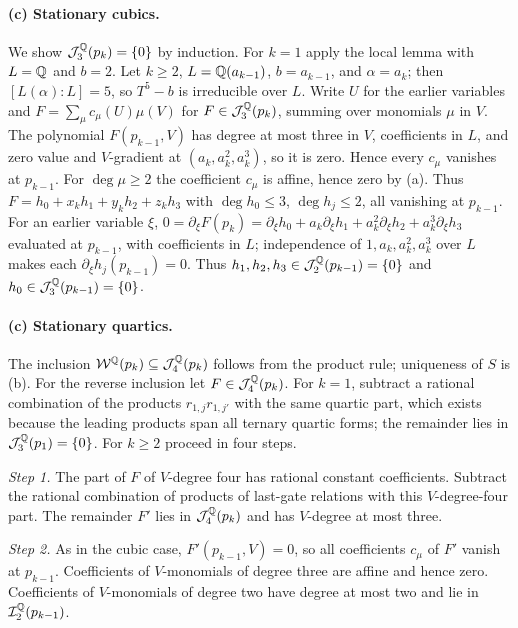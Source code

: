 \paragraph{(c) Stationary cubics.}
We show $\mathcal J_3^\mathbb Q(p_k)=\{0\}$ by induction. For $k=1$ apply the local
lemma with $L=\mathbb Q$ and $b=2$. Let $k\ge2$, $L=\mathbb Q(a_{k-1})$, $b=a_{k-1}$, and
$\alpha=a_k$; then $[L(\alpha):L]=5$, so $T^5-b$ is irreducible over $L$.
Write $U$ for the earlier variables and $F=\sum_\mu c_\mu(U)\mu(V)$ for
$F\in\mathcal J_3^\mathbb Q(p_k)$, summing over monomials $\mu$ in $V$. The
polynomial $F(p_{k-1},V)$ has degree at most three in $V$, coefficients in
$L$, and zero value and $V$-gradient at $(a_k,a_k^2,a_k^3)$, so it is zero.
Hence every $c_\mu$ vanishes at $p_{k-1}$. For $\deg\mu\ge2$ the coefficient
$c_\mu$ is affine, hence zero by (a). Thus
$F=h_0+x_kh_1+y_kh_2+z_kh_3$ with $\deg h_0\le3$, $\deg h_j\le2$, all
vanishing at $p_{k-1}$. For an earlier variable $\xi$,
$0=\partial_\xi F(p_k)=\partial_\xi h_0+a_k\partial_\xi h_1+a_k^2\partial_\xi h_2
+a_k^3\partial_\xi h_3$ evaluated at $p_{k-1}$, with coefficients in $L$;
independence of $1,a_k,a_k^2,a_k^3$ over $L$ makes each
$\partial_\xi h_j(p_{k-1})=0$. Thus
$h_1,h_2,h_3\in\mathcal J_2^\mathbb Q(p_{k-1})=\{0\}$ and
$h_0\in\mathcal J_3^\mathbb Q(p_{k-1})=\{0\}$.

\paragraph{(c) Stationary quartics.}
The inclusion $\mathcal W^\mathbb Q(p_k)\subseteq\mathcal J_4^\mathbb Q(p_k)$ follows from
the product rule; uniqueness of $S$ is (b). For the reverse inclusion let
$F\in\mathcal J_4^\mathbb Q(p_k)$. For $k=1$, subtract a rational combination of the
products $r_{1,j}r_{1,j'}$ with the same quartic part, which exists because
the leading products span all ternary quartic forms; the remainder lies in
$\mathcal J_3^\mathbb Q(p_1)=\{0\}$. For $k\ge2$ proceed in four steps.

\emph{Step 1.} The part of $F$ of $V$-degree four has rational constant
coefficients. Subtract the rational combination of products of last-gate
relations with this $V$-degree-four part. The remainder $F'$ lies in
$\mathcal J_4^\mathbb Q(p_k)$ and has $V$-degree at most three.

\emph{Step 2.} As in the cubic case, $F'(p_{k-1},V)=0$, so all coefficients
$c_\mu$ of $F'$ vanish at $p_{k-1}$. Coefficients of $V$-monomials of degree
three are affine and hence zero. Coefficients of $V$-monomials of degree two
have degree at most two and lie in $\mathcal I_2^\mathbb Q(p_{k-1})$.

